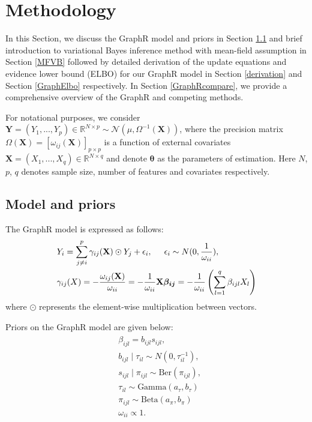 \documentclass[
]{book}
\begin{document}
\hypertarget{method}{%
\chapter{Methodology}\label{method}}

In this Section, we discuss the GraphR model and priors in Section \ref{GraphRmodel} and brief introduction to variational Bayes inference method with mean-field assumption in Section \ref{MFVB} followed by detailed derivation of the update equations and evidence lower bound (ELBO) for our GraphR model in Section \ref{derivation} and Section \ref{GraphElbo} respectively. In Section \ref{GraphRcompare}, we provide a comprehensive overview of the GraphR and competing methods.

For notational purposes, we consider \(\mathbf{Y} = (Y_1,...,Y_p) \in \mathbb{R}^ {N \times p} \sim \mathcal{N}(\mu,\Omega^{-1}(\mathbf{X}))\), where the precision matrix \(\Omega(\mathbf{X}) = [\omega_{ij}(\mathbf{X})]_{p \times p}\) is a function of external covariates \(\mathbf{X} = (X_1,...,X_q) \in \mathbb{R}^ {N \times q}\) and denote \(\boldsymbol{\theta}\) as the parameters of estimation. Here \(N\), \(p\), \(q\) denotes sample size, number of features and covariates respectively.

\hypertarget{GraphRmodel}{%
\section{Model and priors}\label{GraphRmodel}}

The GraphR model is expressed as follows:
\begin{equation}
\begin{split}
&   Y_i = \sum_{j \neq i}^p \gamma_{ij}(\mathbf{X}) \odot Y_j + \epsilon_i, \hspace{0.5cm}  \epsilon_i \sim N(0,\frac{1}{\omega_{ii}}), \\
& \gamma_{ij}(X) = -\frac{\omega_{ij}(\mathbf{X})}{\omega_{ii}} = 
    -\frac{1}{\omega_{ii}} \mathbf{X} \boldsymbol{\beta_{ij}} = 
    -\frac{1}{\omega_{ii}} 
    \left(\sum_{l=1}^q \beta_{ijl}X_l \right)
\end{split}
\label{eq:graph-reg}
\end{equation}
where \(\odot\) represents the element-wise multiplication between vectors.

Priors on the GraphR model are given below:
\begin{align}
\begin{split}
&  \beta_{ijl} = b_{ijl} s_{ijl}, \\
&  b_{ijl} \mid \tau_{il} \sim N (0,\tau_{il}^{-1}), \\
&  s_{ijl} \mid \pi_{ijl} \sim \text{Ber}(\pi_{ijl}), \\
&    \tau_{il} \sim \text{Gamma}(a_\tau,b_\tau) \\
&    \pi_{ijl} \sim \text{Beta}(a_\pi,b_\pi) \\
& \omega_{ii} \propto 1. \\
\end{split}
\label{eq:spike-slab}
\end{align}
\end{document}
